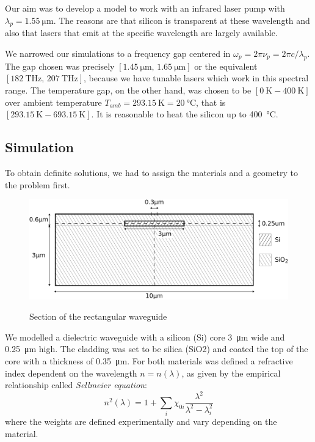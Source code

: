 \documentclass[12pt,a4paper,twoside]{article}
\begin{document}
Our aim was to develop a model to work with an infrared laser pump with $\lambda_{p} = \SI{1.55}{\um}$.
The reasons are that silicon is transparent at these wavelength and also that lasers that emit at the specific wavelength are largely available.

We narrowed our simulations to a frequency gap centered in $\omega_p = 2\pi \nu_p = 2\pi c / \lambda_{p}$.
The gap chosen was precisely $[\SI{1.45}{\um} ,\, \SI{1.65}{\um}]$ or the equivalent $[\SI{182}{\THz} ,\, \SI{207}{\THz}]$, because we have tunable lasers which work in this spectral range.
The temperature gap, on the other hand, was chosen to be $[\SI{0}{\K} - \SI{400}{\K}]$ over ambient temperature $T_{amb} = \SI{293.15}{\K} = \SI{20}{\celsius}$, that is $[\SI{293.15}{\K} - \SI{693.15}{\K}]$. It is reasonable to heat the silicon up to \SI{400}{\celsius}.

\subsection{Simulation}
To obtain definite solutions, we had to assign the materials and a geometry to the problem first.

\begin{figure}[ht]
	\centering
	\includegraphics[width=1\textwidth]{geometry.pdf}
	\label{fig_wg_Section}
	\caption{Section of the rectangular waveguide}
\end{figure}

We modelled a dielectric waveguide with a silicon (Si) core \SI{3}{\um} wide and \SI{.25}{\um} high.
The cladding was set to be silica (SiO2) and coated the top of the core with a thickness of \SI{.35}{\um}.
For both materials was defined a refractive index dependent on the wavelength $n=n(\lambda)$, as given by the empirical relationship called \textit{Sellmeier equation}:
\begin{equation}
	n^2(\lambda) = 1+ \sum_i \chi_{0i}\frac{\lambda^2}{\lambda^2-\lambda^2_i}
	\label{eq_sellmeier}
\end{equation}
where the weights are defined experimentally and vary depending on the material.
\end{document}
